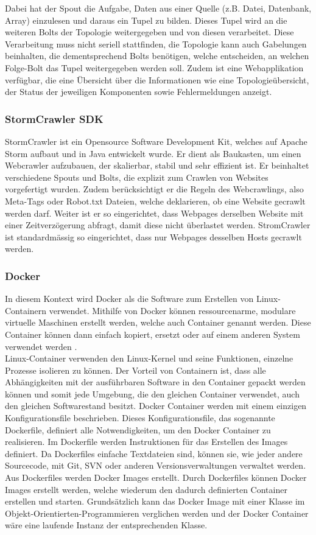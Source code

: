 Dabei hat der Spout die Aufgabe, Daten aus einer Quelle (z.B. Datei, Datenbank, Array) einzulesen und daraus ein Tupel zu bilden.
Dieses Tupel wird an die weiteren Bolts der Topologie weitergegeben und von diesen verarbeitet.
Diese Verarbeitung muss nicht seriell stattfinden, die Topologie kann auch Gabelungen beinhalten, die dementsprechend Bolts benötigen, welche entscheiden, an welchen Folge-Bolt das Tupel weitergegeben werden soll.
Zudem ist eine Webapplikation verfügbar, die eine Übersicht über die Informationen wie eine Topologieübersicht, der Status der jeweiligen Komponenten sowie Fehlermeldungen anzeigt.
\subsubsection{StormCrawler SDK}
StormCrawler ist ein Opensource Software Development Kit, welches auf Apache Storm aufbaut und in Java entwickelt wurde.
Er dient als Baukasten, um einen Webcrawler aufzubauen, der skalierbar, stabil und sehr effizient ist.
Er beinhaltet verschiedene Spouts und Bolts, die explizit zum Crawlen von Websites vorgefertigt wurden.
Zudem berücksichtigt er die Regeln des Webcrawlings, also Meta-Tags oder Robot.txt Dateien, welche deklarieren, ob eine Website gecrawlt werden darf.
Weiter ist er so eingerichtet, dass Webpages derselben Website mit einer Zeitverzögerung abfragt, damit diese nicht überlastet werden.
StromCrawler ist standardmässig so eingerichtet, dass nur Webpages desselben Hosts gecrawlt werden.
\subsubsection{Docker}
In diesem Kontext wird Docker als die Software zum Erstellen von Linux-Containern verwendet.
Mithilfe von Docker können ressourcenarme, modulare virtuelle Maschinen erstellt werden, welche auch Container genannt werden.
Diese Container können dann einfach kopiert, ersetzt oder auf einem anderen System verwendet werden \cite{DockerRetHat}.\\
Linux-Container verwenden den Linux-Kernel und seine Funktionen, einzelne Prozesse isolieren zu können.
Der Vorteil von Containern ist, dass alle Abhängigkeiten mit der ausführbaren Software in den Container gepackt werden können und somit jede Umgebung, die den gleichen Container verwendet, auch den gleichen Softwarestand besitzt.
Docker Container werden mit einem einzigen Konfigurationsfile beschrieben.
Dieses Konfigurationsfile, das sogenannte Dockerfile, definiert alle Notwendigkeiten, um den Docker Container zu realisieren.
Im Dockerfile werden Instruktionen für das Erstellen des Images definiert.
Da Dockerfiles einfache Textdateien sind, können sie, wie jeder andere Sourcecode, mit Git, SVN oder anderen Versionsverwaltungen verwaltet werden.
Aus Dockerfiles werden Docker Images erstellt.
Durch Dockerfiles können Docker Images erstellt werden, welche wiederum den dadurch definierten Container erstellen und starten.
Grundsätzlich kann das Docker Image mit einer Klasse im Objekt-Orientierten-Programmieren verglichen werden und der Docker Container wäre eine laufende Instanz der entsprechenden Klasse. 

